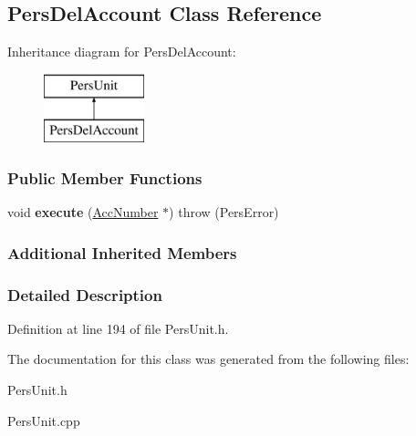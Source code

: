 \hypertarget{classPersDelAccount}{\subsection{Pers\-Del\-Account Class Reference}
\label{d6/d74/classPersDelAccount}
}
Inheritance diagram for Pers\-Del\-Account\-:\begin{figure}[H]
\begin{center}
\leavevmode
\includegraphics[height=2.000000cm]{d6/d74/classPersDelAccount}
\end{center}
\end{figure}
\subsubsection*{Public Member Functions}
\begin{DoxyCompactItemize}
\item 
\hypertarget{classPersDelAccount_a711d6dc413c1bc56ec70225ca6734c67}{void {\bfseries execute} (\hyperlink{classAccNumber}{Acc\-Number} $\ast$)  throw (\-Pers\-Error)}\label{d6/d74/classPersDelAccount_a711d6dc413c1bc56ec70225ca6734c67}

\end{DoxyCompactItemize}
\subsubsection*{Additional Inherited Members}


\subsubsection{Detailed Description}


Definition at line 194 of file Pers\-Unit.\-h.



The documentation for this class was generated from the following files\-:\begin{DoxyCompactItemize}
\item 
Pers\-Unit.\-h\item 
Pers\-Unit.\-cpp\end{DoxyCompactItemize}
